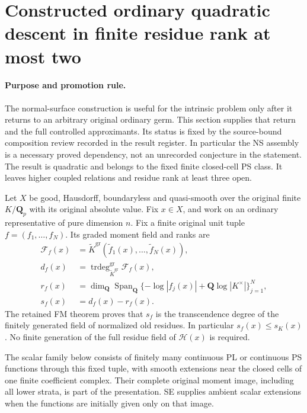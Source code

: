 \section{Constructed ordinary quadratic descent in finite residue rank at most two}
\label{sec:r11-ordinary-residue-two}

\paragraph{Purpose and promotion rule.}
The normal-surface construction is useful for the intrinsic problem
only after it returns to an arbitrary original ordinary germ. This
section supplies that return and the full controlled approximants.
Its status is fixed by the source-bound composition review recorded
in the result register. In particular the NS assembly is a necessary
proved dependency, not an unrecorded conjecture in the statement.
The result is quadratic and belongs to the fixed finite closed-cell
PS class. It leaves higher coupled relations and residue rank at
least three open.

Let \(X\) be good, Hausdorff, boundaryless and quasi-smooth over
the original finite \(K/\mathbf Q_p\) with its original absolute
value. Fix \(x\in X\), and work on an ordinary representative
of pure dimension \(n\). Fix a finite original unit tuple
\(f=(f_1,\ldots,f_N)\). Its graded moment field and ranks are
\[
\begin{aligned}
 \mathscr F_f(x)&=\widetilde K^{\mathrm{gr}}
          (\widetilde f_1(x),\ldots,\widetilde f_N(x)),\\
 d_f(x)&=\operatorname{trdeg}^{\mathrm{gr}}_{\widetilde K^{\mathrm{gr}}}
                         \mathscr F_f(x),\\
 r_f(x)&=\dim_{\mathbf Q}\operatorname{Span}_{\mathbf Q}
  \{-\log|f_j(x)|+\mathbf Q\log|K^\times|\}_{j=1}^N,\\
 s_f(x)&=d_f(x)-r_f(x).
\end{aligned}
\tag{OR1}
\]
The retained FM theorem proves that \(s_f\) is the transcendence
degree of the finitely generated field of normalized old residues.
In particular \(s_f(x)\le s_K(x)\). No finite generation of the
full residue field of \(\mathcal H(x)\) is required.

The scalar family below consists of finitely many continuous PL or
continuous PS functions through this fixed tuple, with smooth
extensions near the closed cells of one finite coefficient complex.
Their complete original moment image, including all lower strata,
is part of the presentation. SE supplies ambient scalar extensions
when the functions are initially given only on that image.

